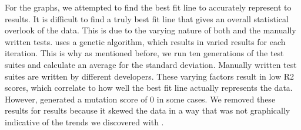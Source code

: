 For the graphs, we attempted to find the best fit line to accurately represent to results. It is difficult to find a truly best fit line that gives an overall statistical overlook of the data. This is due to the varying nature of both \evo and the manually written tests. \evo uses a genetic algorithm, which results in varied results for each iteration. This is why as mentioned before, we run ten generations of the test suites and calculate an average for the standard deviation. Manually written test suites are written by different developers. These varying factors result in low  R2 scores, which correlate to how well the best fit line actually represents the data. However, \codepro generated a mutation score of 0 in some cases. We removed these results for \codepro results because it skewed the data in a way that was not graphically indicative of the trends we discovered with \codepro. 

\begin{table}[!t]
\caption{Benchmark Programs and their Properties}
\label{tbl:program_table}
\end{table}



